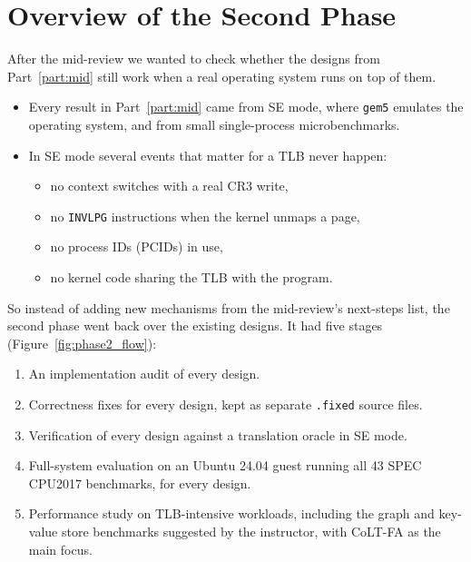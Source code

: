 
\section{Overview of the Second Phase}
\label{sec:phase2}

After the mid-review we wanted to check whether the designs from Part~\ref{part:mid} still work when a real operating system runs on top of them.
\begin{itemize}
    \item Every result in Part~\ref{part:mid} came from SE mode, where \texttt{gem5} emulates the operating system, and from small single-process microbenchmarks.
    \item In SE mode several events that matter for a TLB never happen:
    \begin{itemize}
        \item no context switches with a real CR3 write,
        \item no \texttt{INVLPG} instructions when the kernel unmaps a page,
        \item no process IDs (PCIDs) in use,
        \item no kernel code sharing the TLB with the program.
    \end{itemize}
\end{itemize}

\noindent So instead of adding new mechanisms from the mid-review's next-steps list, the second phase went back over the existing designs. It had five stages (Figure~\ref{fig:phase2_flow}):
\begin{enumerate}
    \item An implementation audit of every design.
    \item Correctness fixes for every design, kept as separate \texttt{.fixed} source files.
    \item Verification of every design against a translation oracle in SE mode.
    \item Full-system evaluation on an Ubuntu 24.04 guest running all 43 SPEC CPU2017 benchmarks, for every design.
    \item Performance study on TLB-intensive workloads, including the graph and key-value store benchmarks suggested by the instructor, with CoLT-FA as the main focus.
\end{enumerate}

